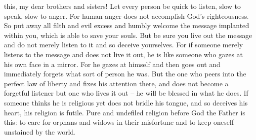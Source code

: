 {this, my
dear
brothers and sisters! Let
every
person
be
quick
to
listen,
slow
to
speak,
slow
to
anger.
For
human
anger
does
not
accomplish
God’s
righteousness.
So
put away
all
filth
and
evil
excess
and humbly
welcome
the message
implanted
within you, which is able
to save
your
souls.
But
be sure you
live out
the message
and
do not
merely
listen
to it and so deceive
yourselves.
For
if
someone
merely
listens to the message
and
does
not
live
it
out,
he is like
someone
who gazes at
his own face
in
a mirror.
For
he gazes at
himself
and
then goes out
and
immediately
forgets
what sort of person
he was.
But
the one who peers
into
the perfect
law
of liberty
and
fixes
his attention
there, and does
not
become
a forgetful
listener
but
one who lives
it
out
– he
will be
blessed
in
what he
does.
If
someone
thinks
he is
religious
yet does
not
bridle
his
tongue,
and so
deceives
his
heart,
his religion
is futile.
Pure
and
undefiled
religion
before
God
the Father
is
this: to care for
orphans
and
widows
in
their
misfortune
and to keep
oneself
unstained
by
the world.

}
